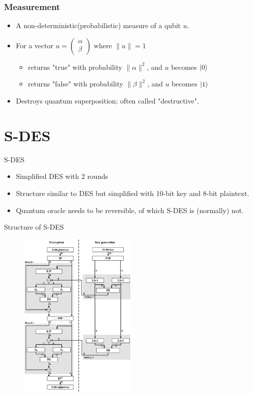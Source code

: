 \documentclass{beamer}
\begin{document}
    \begin{frame}
        \frametitle{Measurement}
        \begin{itemize}
            \item A non-deterministic(probabilistic) measure of a qubit $u$.
            \item For a vector $u=\begin{pmatrix} \alpha \\ \beta \end{pmatrix}$ where $\|u\|=1$
            \begin{itemize}
                \item returns "true" with probability $\|\alpha\|^2$, and $u$ becomes $\ket{0}$
                \item returns "false" with probability $\|\beta\|^2$, and $u$ becomes $\ket{1}$
            \end{itemize}
            \item Destroys quantum superposition; often called "destructive".
        \end{itemize}
    \end{frame}
    \fi

    \section{S-DES}

        \begin{frame}{S-DES}
        \begin{itemize}
            \item Simplified DES with 2 rounds
            \item Structure similar to DES but simplified with 10-bit key and 8-bit plaintext.
            \item Quantum oracle needs to be reversible, of which S-DES is (normally) not.
        \end{itemize}
    \end{frame}

    \begin{frame}{Structure of S-DES}
        \begin{figure}[h]
            \centering
            \includegraphics[width=0.5\textwidth]{./Images/sdes.png}
        \end{figure}
    \end{frame}
\end{document}
